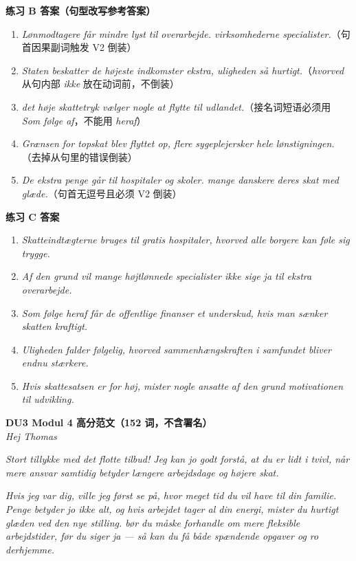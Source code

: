 \begin{answerbox}
\textbf{练习 B 答案（句型改写参考答案）}
\begin{enumerate}
  \item \textit{Lønmodtagere får mindre lyst til overarbejde.  virksomhederne specialister.}（句首因果副词触发 V2 倒装）
  \item \textit{Staten beskatter de højeste indkomster ekstra,  uligheden  så hurtigt.}（\textit{hvorved} 从句内部 \textit{ikke} 放在动词前，不倒装）
  \item \textit{ det høje skattetryk vælger nogle at flytte til udlandet.}（接名词短语必须用 \textit{Som følge af}，不能用 \textit{heraf}）
  \item \textit{Grænsen for topskat blev flyttet op,  flere sygeplejersker  hele lønstigningen.}（去掉从句里的错误倒装）
  \item \textit{De ekstra penge går til hospitaler og skoler.  mange danskere deres skat med glæde.}（句首无逗号且必须 V2 倒装）
\end{enumerate}

\textbf{练习 C 答案}
\begin{enumerate}
  \item \textit{Skatteindtægterne bruges til gratis hospitaler, hvorved alle borgere kan føle sig trygge.}
  \item \textit{Af den grund vil mange højtlønnede specialister ikke sige ja til ekstra overarbejde.}
  \item \textit{Som følge heraf får de offentlige finanser et underskud, hvis man sænker skatten kraftigt.}
  \item \textit{Uligheden falder følgelig, hvorved sammenhængskraften i samfundet bliver endnu stærkere.}
  \item \textit{Hvis skattesatsen er for høj, mister nogle ansatte af den grund motivationen til udvikling.}
\end{enumerate}

\textbf{DU3 Modul 4 高分范文（152 词，不含署名）}\\
\textit{Hej Thomas}

\textit{Stort tillykke med det flotte tilbud! Jeg kan jo godt forstå, at du er lidt i tvivl, når mere ansvar samtidig betyder længere arbejdsdage og højere skat.}

\textit{Hvis jeg var dig, ville jeg først se på, hvor meget tid du vil have til din familie. Penge betyder jo ikke alt, og hvis arbejdet tager al din energi, mister du hurtigt glæden ved den nye stilling.  bør du måske forhandle om mere fleksible arbejdstider, før du siger ja --- så kan du få både spændende opgaver og ro derhjemme.}


\end{answerbox}
